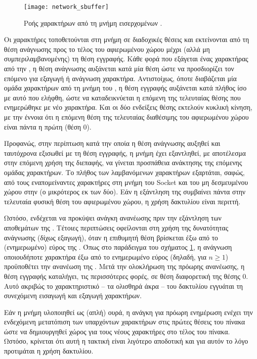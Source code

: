 \begin{figure}
    \caption{Ροής χαρακτήρων από τη μνήμη εισερχομένων .
    \label{fig:network:sbuffer}}
    \begin{center}
    \texttt{[image: network\_sbuffer]}
    \end{center}
\end{figure}

Οι χαρακτήρες τοποθετούνται στη μνήμη  σε διαδοχικές θέσεις και
εκτείνονται από τη θέση ανάγνωσης προς το τέλος του αφιερωμένου χώρου μέχρι
(αλλά μη συμπεριλαμβανομένης) τη θέση εγγραφής. Κάθε φορά που εξάγεται ένας
χαρακτήρας από την , η θέση ανάγνωσης αυξάνεται κατά μία θέση ώστε να
προσδιορίζει τον επόμενο για εξαγωγή ή ανάγνωση χαρακτήρα. Αντιστοίχως, όποτε
διαβάζεται μία ομάδα χαρακτήρων από τη μνήμη του , η θέση εγγραφής
αυξάνεται κατά πλήθος ίσο με αυτό που ελήφθη, ώστε να καταδεικνύεται η επόμενη
της τελευταίας θέσης που ενημερώθηκε με νέο χαρακτήρα. Και οι δύο ενδείξεις
θέσης εκτελούν κυκλική κίνηση, με την έννοια ότι η επόμενη θέση της τελευταίας
διαθέσιμης του αφιερωμένου χώρου είναι πάντα η πρώτη (θέση 0).

Προφανώς, στην περίπτωση κατά την οποία η θέση ανάγνωσης αυξηθεί και ταυτόχρονα
εξισωθεί με τη θέση εγγραφής, η μνήμη  έχει εξαντληθεί,
με αποτέλεσμα στην επόμενη χρήση της διεπαφής, να γίνεται προσπάθεια ανάκτησης
της επόμενης ομάδας χαρακτήρων. Το πλήθος των λαμβανόμενων χαρακτήρων εξαρτάται,
σαφώς, από τους εναπομείναντες χαρακτήρες στη μνήμη του Socket και του μη
δεσμευμένου χώρου στην  (ο μικρότερος εκ των δύο). Εάν η εξάντληση της
 συμβαίνει πάντα στην τελευταία φυσική θέση του αφιερωμένου χώρου, η
χρήση δακτυλίου είναι περιττή.

Ωστόσο, ενδέχεται να προκύψει ανάγκη ανανέωσης πριν την εξάντληση των αποθεμάτων
της . Τέτοιες περιπτώσεις οφείλονται στη χρήση της δυνατότητας
ανάγνωσης (δίχως εξαγωγή), όταν η επιθυμητή θέση βρίσκεται έξω από το
(ενημερωμένο) εύρος της . Όπως στο παράδειγμα του σχήματος
\ref{fig:network:sbuffer}, η ανάγνωση οποιουδήποτε χαρακτήρα έξω από το
ενημερωμένο εύρος (δηλαδή, για $n \ge 1$) προϋποθέτει την ανανέωση της
. Μετά την ολοκλήρωση της πρόωρης ανανέωσης, η θέση εγγραφής
καταλήγει, τις περισσότερες φορές, σε θέση διαφορετική της θέσης 0.
Αυτό ακριβώς το χαρακτηριστικό -- τα ολισθηρά άκρα -- του δακτυλίου εγγυάται τη
συνεχόμενη εισαγωγή και εξαγωγή χαρακτήρων.

Εάν η μνήμη  υλοποιηθεί ως (απλή) ουρά, η ανάγκη για πρόωρη ενημέρωση
ενέχει την ενδεχόμενη μετατόπιση των υπαρχόντων χαρακτήρων στις πρώτες θέσεις
του πίνακα ώστε να δημιουργηθεί χώρος για τους νέους χαρακτήρες στο τέλος του
πίνακα. Ωστόσο, κρίνεται ότι αυτή η τακτική είναι λιγότερο αποδοτική και για
αυτόν το λόγο προτιμάται η χρήση δακτυλίου.

